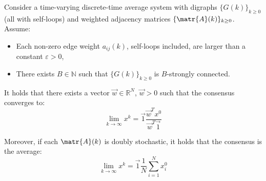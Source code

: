 \begin{theorem} 
    Consider a time-varying discrete-time average system with digraphs $\{G(k)\}_{k \geq 0}$ (all with self-loops) and weighted adjacency matrices $\{\matr{A}(k)\}_{k \geq 0}$. Assume:
    \begin{itemize}
        \item Each non-zero edge weight $a_{ij}(k)$, self-loops included, are larger than a constant $\varepsilon > 0$,
        \item There exists $B \in \mathbb{N}$ such that $\{G(k)\}_{k \geq 0}$ is $B$-strongly connected.
    \end{itemize}
    
    It holds that there exists a vector $\vec{w} \in \mathbb{R}^N$, $\vec{w} > 0$ such that the consensus converges to:
        \[ 
            \lim_{k \rightarrow \infty} x^k 
            = \vec{1}\frac{\vec{w}^T x^0}{\vec{w}^T\vec{1}} 
        \]

    Moreover, if each $\matr{A}(k)$ is doubly stochastic, it holds that the consensus is the average:
    \[ 
        \lim_{k \rightarrow \infty} x^k = \vec{1} \frac{1}{N} \sum_{i=1}^N x_i^0
    \]
\end{theorem}